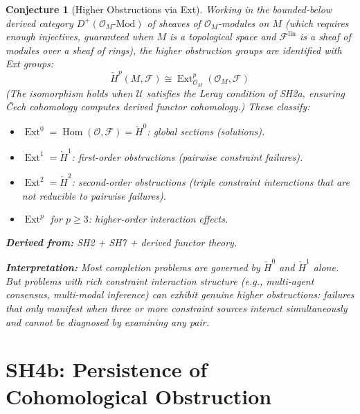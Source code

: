 \documentclass[11pt,letterpaper]{article}
\newtheorem{conjecture}{Conjecture}[section]
\newcommand{\Hcech}{\check{H}}
\newcommand{\sheaf}{\mathcal{F}}
\newcommand{\cover}{\mathcal{U}}
\DeclareMathOperator{\Hom}{Hom}
\DeclareMathOperator{\Ext}{Ext}
\begin{document}
\begin{conjecture}[Higher Obstructions via 
Ext]\label{conj:ext}
Working in the bounded-below derived category $D^+(\mathcal{O}_M
\text{-Mod})$ of sheaves of $\mathcal{O}_M$-modules on $M$ (which 
requires enough injectives, guaranteed when $M$ is a topological 
space and $\sheaf^{\mathrm{lin}}$ is a sheaf of modules over a sheaf 
of rings), the higher obstruction groups are identified with Ext 
groups:
\begin{equation}\label{eq:ext}
    \Hcech^p(M, \sheaf) \cong \Ext^p_{\mathcal{O}_M}
    (\mathcal{O}_M, \sheaf)
\end{equation}
(The isomorphism holds when $\cover$ satisfies the Leray condition of 
SH2a, ensuring \v{C}ech cohomology computes derived functor cohomology.)
These classify:
\begin{itemize}
    \item $\Ext^0 = \Hom(\mathcal{O}, \sheaf) = \Hcech^0$: global 
    sections (solutions).
    \item $\Ext^1 = \Hcech^1$: first-order obstructions 
    (pairwise constraint failures).
    \item $\Ext^2 = \Hcech^2$: second-order obstructions 
    (triple constraint interactions that are not reducible to 
    pairwise failures).
    \item $\Ext^p$ for $p \geq 3$: higher-order interaction effects.
\end{itemize}

\textbf{Derived from:} SH2 + SH7 + derived functor theory.

\textbf{Interpretation:} Most completion problems are governed by 
$\Hcech^0$ and $\Hcech^1$ alone. But problems with rich constraint 
interaction structure (e.g., multi-agent consensus, multi-modal 
inference) can exhibit genuine higher obstructions: failures that 
only manifest when three or more constraint sources interact 
simultaneously and cannot be diagnosed by examining any pair.
\end{conjecture}

\section{SH4b: Persistence of Cohomological Obstruction}
\end{document}
